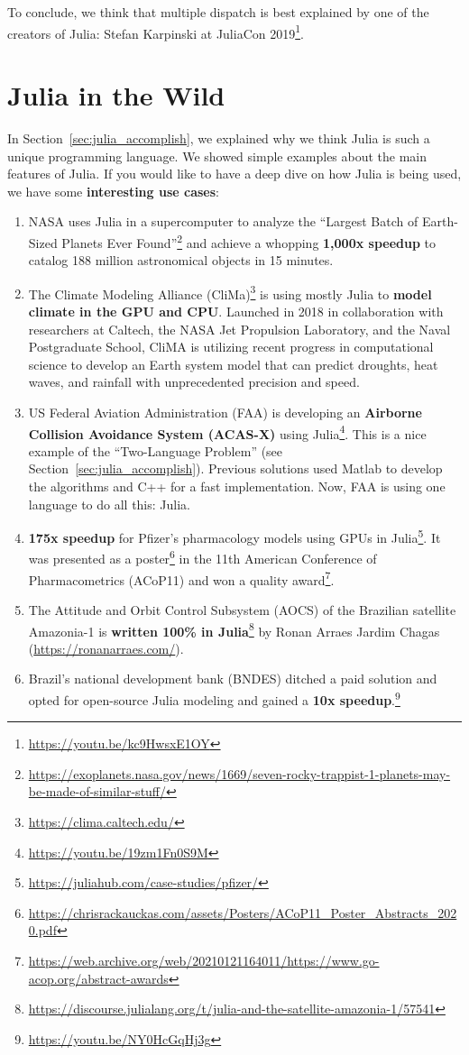 \documentclass[
  notoc %
]{tufte-book}
\DeclareRobustCommand{\href}[2]{#2\footnote{\url{#1}}}
\providecommand{\tightlist}{%
  \setlength{\itemsep}{0pt}\setlength{\parskip}{0pt}
}
\begin{document}
To conclude, we think that multiple dispatch is best explained by one of
the creators of Julia: \href{https://youtu.be/kc9HwsxE1OY}{Stefan
Karpinski at JuliaCon 2019}.

\hypertarget{sec:julia_wild}{%
\section{Julia in the Wild}\label{sec:julia_wild}}

In Section~\ref{sec:julia_accomplish}, we explained why we think Julia
is such a unique programming language. We showed simple examples about
the main features of Julia. If you would like to have a deep dive on how
Julia is being used, we have some \textbf{interesting use cases}:

\begin{enumerate}
\def\labelenumi{\arabic{enumi}.}
\tightlist
\item
  NASA uses Julia in a supercomputer to analyze the
  \href{https://exoplanets.nasa.gov/news/1669/seven-rocky-trappist-1-planets-may-be-made-of-similar-stuff/}{``Largest
  Batch of Earth-Sized Planets Ever Found''} and achieve a whopping
  \textbf{1,000x speedup} to catalog 188 million astronomical objects in
  15 minutes.
\item
  \href{https://clima.caltech.edu/}{The Climate Modeling Alliance
  (CliMa)} is using mostly Julia to \textbf{model climate in the GPU and
  CPU}. Launched in 2018 in collaboration with researchers at Caltech,
  the NASA Jet Propulsion Laboratory, and the Naval Postgraduate School,
  CliMA is utilizing recent progress in computational science to develop
  an Earth system model that can predict droughts, heat waves, and
  rainfall with unprecedented precision and speed.
\item
  \href{https://youtu.be/19zm1Fn0S9M}{US Federal Aviation Administration
  (FAA) is developing an \textbf{Airborne Collision Avoidance System
  (ACAS-X)} using Julia}. This is a nice example of the ``Two-Language
  Problem'' (see Section~\ref{sec:julia_accomplish}). Previous solutions
  used Matlab to develop the algorithms and C++ for a fast
  implementation. Now, FAA is using one language to do all this: Julia.
\item
  \href{https://juliahub.com/case-studies/pfizer/}{\textbf{175x speedup}
  for Pfizer's pharmacology models using GPUs in Julia}. It was
  presented as a
  \href{https://chrisrackauckas.com/assets/Posters/ACoP11_Poster_Abstracts_2020.pdf}{poster}
  in the 11th American Conference of Pharmacometrics (ACoP11) and
  \href{https://web.archive.org/web/20210121164011/https://www.go-acop.org/abstract-awards}{won
  a quality award}.
\item
  \href{https://discourse.julialang.org/t/julia-and-the-satellite-amazonia-1/57541}{The
  Attitude and Orbit Control Subsystem (AOCS) of the Brazilian satellite
  Amazonia-1 is \textbf{written 100\% in Julia}} by Ronan Arraes Jardim
  Chagas (\url{https://ronanarraes.com/}).
\item
  \href{https://youtu.be/NY0HcGqHj3g}{Brazil's national development bank
  (BNDES) ditched a paid solution and opted for open-source Julia
  modeling and gained a \textbf{10x speedup}.}
\end{enumerate}
\end{document}
